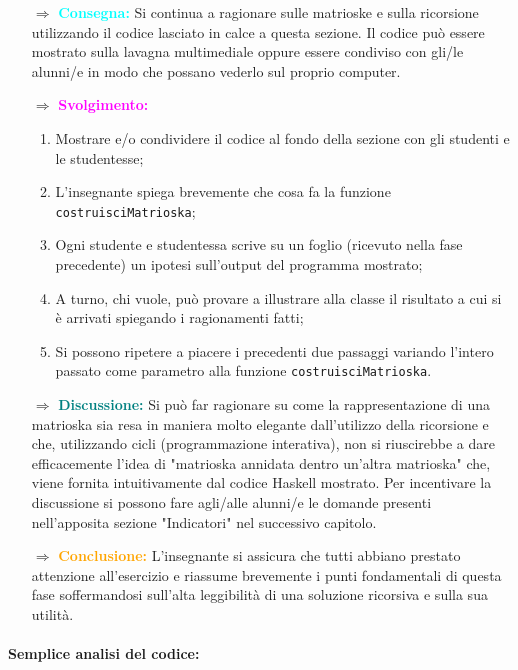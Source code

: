 \begin{itemize}
    \item [$\Rightarrow$] \textbf{\textcolor{cyan}{Consegna:}} Si continua a ragionare sulle matrioske
    e sulla ricorsione utilizzando il codice lasciato in calce a questa sezione. Il codice può
    essere mostrato sulla lavagna multimediale oppure essere condiviso con gli/le alunni/e in
    modo che possano vederlo sul proprio computer.
    \item [$\Rightarrow$] \textbf{\textcolor{magenta}{Svolgimento:}}
    \begin{enumerate}
        \item Mostrare e/o condividere il codice al fondo della sezione con gli studenti e le studentesse;
        \item L'insegnante spiega brevemente che cosa fa la funzione \texttt{costruisciMatrioska};
        \item Ogni studente e studentessa scrive su un foglio (ricevuto nella fase precedente) un ipotesi
        sull'output del programma mostrato;
        \item A turno, chi vuole, può provare a illustrare alla classe il risultato a cui si è arrivati spiegando i ragionamenti fatti;
        \item Si possono ripetere a piacere i precedenti due passaggi variando l'intero passato come parametro
        alla funzione \texttt{costruisciMatrioska}.
    \end{enumerate}
    \item [$\Rightarrow$] \textbf{\textcolor{teal}{Discussione:}} Si può far ragionare su come la rappresentazione
    di una matrioska sia resa in maniera molto elegante dall'utilizzo della ricorsione e che, utilizzando cicli (programmazione interativa),
    non si riuscirebbe a dare efficacemente l'idea di "matrioska annidata dentro un'altra matrioska" che,
    viene fornita intuitivamente dal codice Haskell mostrato. Per incentivare la discussione si possono 
    fare agli/alle alunni/e le domande presenti nell'apposita sezione "Indicatori" nel successivo capitolo.
    \item [$\Rightarrow$] \textbf{\textcolor{orange}{Conclusione:}} L'insegnante si assicura
    che tutti abbiano prestato attenzione all'esercizio e riassume brevemente i punti fondamentali
    di questa fase soffermandosi sull'alta leggibilità di una soluzione ricorsiva e sulla sua utilità.
\end{itemize}

\paragraph{Semplice analisi del codice:}

